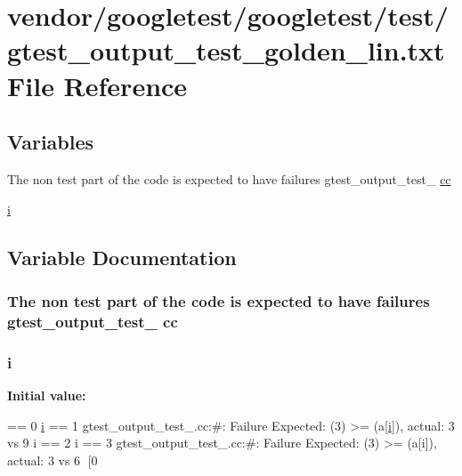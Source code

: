 \hypertarget{gtest__output__test__golden__lin_8txt}{}\section{vendor/googletest/googletest/test/gtest\+\_\+output\+\_\+test\+\_\+golden\+\_\+lin.txt File Reference}
\label{gtest__output__test__golden__lin_8txt}
\subsection*{Variables}
\begin{DoxyCompactItemize}
\item 
The non test part of the code is expected to have failures gtest\+\_\+output\+\_\+test\+\_\+ \hyperlink{gtest__output__test__golden__lin_8txt_a36ebfe06d2a8523cebd158fbc62be565}{cc}
\item 
\hyperlink{gtest__output__test__golden__lin_8txt_a7e98b8a17c0aad30ba64d47b74e2a6c1}{i}
\end{DoxyCompactItemize}


\subsection{Variable Documentation}
\subsubsection[{\texorpdfstring{cc}{cc}}]{\setlength{\rightskip}{0pt plus 5cm}The non test part of the code is expected to have failures gtest\+\_\+output\+\_\+test\+\_\+ cc}\hypertarget{gtest__output__test__golden__lin_8txt_a36ebfe06d2a8523cebd158fbc62be565}{}\label{gtest__output__test__golden__lin_8txt_a36ebfe06d2a8523cebd158fbc62be565}
\subsubsection[{\texorpdfstring{i}{i}}]{\setlength{\rightskip}{0pt plus 5cm}i}\hypertarget{gtest__output__test__golden__lin_8txt_a7e98b8a17c0aad30ba64d47b74e2a6c1}{}\label{gtest__output__test__golden__lin_8txt_a7e98b8a17c0aad30ba64d47b74e2a6c1}
{\bfseries Initial value\+:}
\begin{DoxyCode}
== 0
\hyperlink{gtest__output__test__golden__lin_8txt_a7e98b8a17c0aad30ba64d47b74e2a6c1}{i} == 1
gtest\_output\_test\_.cc:#: Failure
Expected: (3) >= (a[\hyperlink{gtest__output__test__golden__lin_8txt_a7e98b8a17c0aad30ba64d47b74e2a6c1}{i}]), actual: 3 vs 9
i == 2
i == 3
gtest\_output\_test\_.cc:#: Failure
Expected: (3) >= (a[i]), actual: 3 vs 6
[0
\end{DoxyCode}
